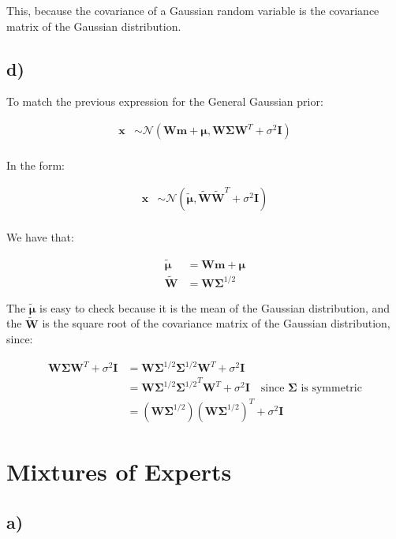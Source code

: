 \documentclass[12pt,a4paper,oneside]{paper}
\begin{document}
This, because the covariance of a Gaussian random variable is the covariance matrix of the Gaussian distribution. 

\subsection*{d)}

To match the previous expression for the General Gaussian prior:

\begin{align*}
    \bm{x} &\sim \mathcal{N}(\bm{W}\bm{m} + \bm{\mu}, \bm{W} \bm{\Sigma} \bm{W}^T + \sigma^2 \bm{I}) \\
\end{align*}

In the form:

\begin{align*}
    \bm{x} &\sim \mathcal{N}(\tilde{\bm{\mu}}, \bm{\tilde{W}} \bm{\tilde{W}}^T + \sigma^2 \bm{I}) \\
\end{align*}

We have that:

\begin{align*}
    \tilde{\bm{\mu}} &= \bm{W}\bm{m} + \bm{\mu} \\
    \bm{\tilde{W}} &= \bm{W} \bm{\Sigma}^{1/2}
\end{align*}

The $\tilde{\bm{\mu}}$ is easy to check because it is the mean of the Gaussian distribution, and the $\bm{\tilde{W}}$ is the square root of the covariance matrix of the Gaussian distribution, since:

\begin{align*}
    \bm{W} \bm{\Sigma} \bm{W}^T + \sigma^2 \bm{I} &= \bm{W} \bm{\Sigma}^{1/2} \bm{\Sigma}^{1/2} \bm{W}^T + \sigma^2 \bm{I} \\
    &= \bm{W} \bm{\Sigma}^{1/2} {\bm{\Sigma}^{1/2}}^T \bm{W}^T + \sigma^2 \bm{I} \quad \text{since $\bm{\Sigma}$ is symmetric} \\
    &= (\bm{W} \bm{\Sigma}^{1/2}) (\bm{W} \bm{\Sigma}^{1/2})^T + \sigma^2 \bm{I}
\end{align*}

\section{Mixtures of Experts}

\subsection*{a)}
\end{document}
